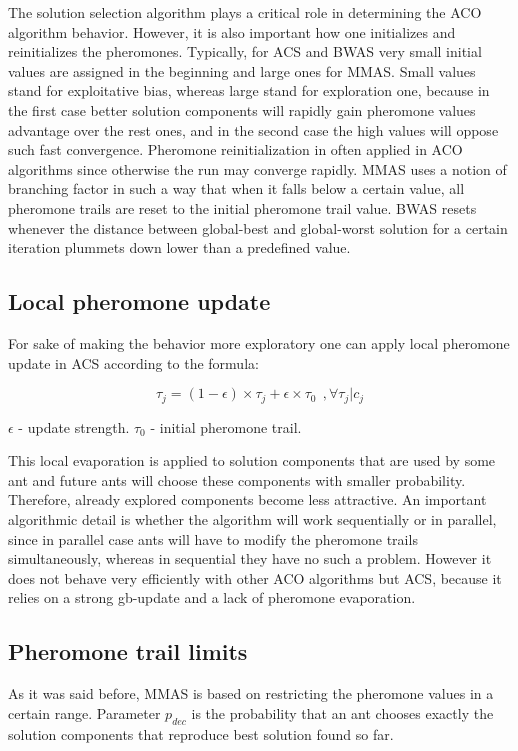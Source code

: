 \documentclass[12pt,a4paper,oneside]{book}
\begin{document}
The solution selection algorithm plays a critical role in determining the ACO algorithm behavior. However, it is also important how one initializes and reinitializes the pheromones. Typically, for ACS and BWAS very small initial values are assigned in the beginning and large ones for MMAS. Small values stand for exploitative bias, whereas large stand for exploration one, because in the first case better solution components will rapidly gain pheromone values advantage over the rest ones, and in the second case the high values will oppose such fast convergence. Pheromone reinitialization in often applied in ACO algorithms since otherwise the run may converge rapidly. MMAS uses a notion of branching factor in such a way that when it falls below a certain value, all pheromone trails are reset to the initial pheromone trail value. BWAS resets whenever the distance between global-best and global-worst solution for a certain iteration plummets down lower than a predefined value.


\subsection{Local pheromone update}
For sake of making the behavior more exploratory one can apply \cite{Dorigo1997} local pheromone update in ACS according to the formula:

\begin{equation}
\tau_j = (1 - \epsilon) \times \tau_j + \epsilon \times \tau_0 \ \ ,\forall \tau_j | c_j
\label{eq:local_update}
\end{equation}

$\epsilon$ - update strength. $\tau_0$ - initial pheromone trail.

This local evaporation is applied to solution components that are used by some ant and future ants will choose these components with smaller probability. Therefore, already explored components become less attractive. An important algorithmic detail is whether the algorithm will work sequentially or in parallel, since in parallel case ants will have to modify the pheromone trails simultaneously, whereas in sequential they have no such a problem. However it does not behave very efficiently with other ACO algorithms but ACS, because it relies on a strong gb-update and a lack of pheromone evaporation.

\subsection{Pheromone trail limits}
As it was said before, MMAS is based on restricting the pheromone values in a certain range. Parameter $p_{dec}$ is the probability that an ant chooses exactly the solution components that reproduce best solution found so far.
\end{document}
